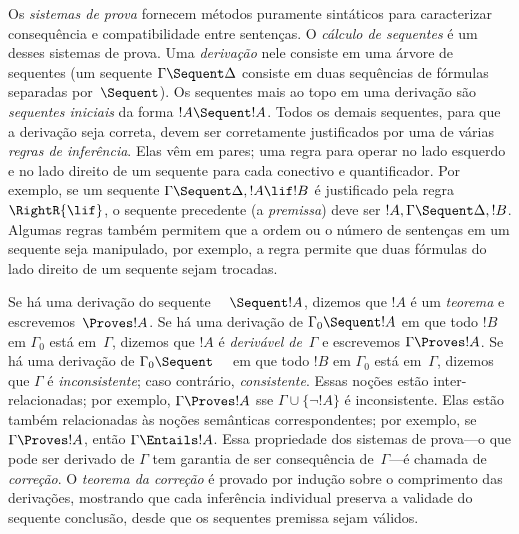 Os \emph{sistemas de prova} fornecem métodos puramente sintáticos para
caracterizar consequência e compatibilidade entre sentenças.
O \emph{cálculo de sequentes} é um desses sistemas de
prova. Uma \emph{derivação} nele consiste em uma árvore de sequentes (um
sequente $\Gamma \Sequent \Delta$ consiste em duas sequências de fórmulas
separadas por~$\Sequent$). Os sequentes mais ao topo em uma derivação
são \emph{sequentes iniciais} da forma $!A \Sequent !A$.  Todos os demais
sequentes, para que a derivação seja correta, devem ser corretamente
justificados por uma de várias \emph{regras de inferência}. Elas vêm em
pares; uma regra para operar no lado esquerdo e no lado direito de um
sequente para cada conectivo e quantificador. Por exemplo, se um sequente
$\Gamma \Sequent \Delta, !A \lif !B$ é justificado pela regra
$\RightR{\lif}$, o sequente precedente (a \emph{premissa}) deve
ser $!A, \Gamma \Sequent \Delta, !B$. Algumas regras também permitem que a ordem
ou o número de sentenças em um sequente seja manipulado, por exemplo,
a regra \RightR{\Exchange} permite que duas fórmulas do lado direito de um
sequente sejam trocadas.

Se há uma derivação do sequente $\quad \Sequent !A$, dizemos que
$!A$ é um \emph{teorema} e escrevemos~$\Proves !A$. Se há uma
derivação de $\Gamma_0 \Sequent !A$ em que todo $!B$ em $\Gamma_0$ está
em~$\Gamma$, dizemos que $!A$ é \emph{derivável de}~$\Gamma$ e escrevemos
$\Gamma \Proves !A$. Se há uma derivação de
$\Gamma_0 \Sequent \quad$ em que todo $!B$ em $\Gamma_0$ está
em~$\Gamma$, dizemos que $\Gamma$ é \emph{inconsistente}; caso contrário,
\emph{consistente}. Essas noções estão inter-relacionadas; por exemplo, $\Gamma
\Proves !A$ sse $\Gamma \cup \{\lnot !A\}$ é inconsistente. Elas estão
também relacionadas às noções semânticas correspondentes; por exemplo, se $\Gamma
\Proves !A$, então $\Gamma \Entails !A$. Essa propriedade dos sistemas de
prova---o que pode ser derivado de $\Gamma$ tem garantia de ser
consequência de~$\Gamma$---é chamada de \emph{correção}. O \emph{teorema da
correção} é provado por indução sobre o comprimento das derivações, mostrando
que cada inferência individual preserva a validade do sequente
conclusão, desde que os sequentes premissa sejam válidos.
